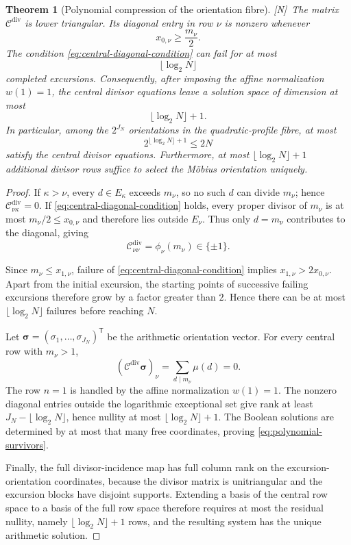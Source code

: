 \documentclass[11pt]{amsart}
\numberwithin{equation}{section}
\theoremstyle{plain}
\newtheorem{theorem}{Theorem}[section]
\theoremstyle{definition}
\theoremstyle{remark}
\newcommand{\tagN}{\textup{[N]}}
\begin{document}
\begin{theorem}[Polynomial compression of the orientation fibre]
\label{thm:polynomial-orientation-compression}
\tagN\ The matrix $\mathscr C^{\mathrm{div}}$ is lower triangular.  Its diagonal entry in row $\nu$ is nonzero whenever
\begin{equation}
x_{0,\nu}\ge \frac{m_\nu}{2}.
\label{eq:central-diagonal-condition}
\end{equation}
The condition \eqref{eq:central-diagonal-condition} can fail for at most
\[
\lfloor\log_2N\rfloor
\]
completed excursions.  Consequently, after imposing the affine normalization $w(1)=1$, the central divisor equations leave a solution space of dimension at most
\[
\lfloor\log_2N\rfloor+1.
\]
In particular, among the $2^{J_N}$ orientations in the quadratic-profile fibre, at most
\begin{equation}
2^{\lfloor\log_2N\rfloor+1}\le2N
\label{eq:polynomial-survivors}
\end{equation}
satisfy the central divisor equations.  Furthermore, at most $\lfloor\log_2N\rfloor+1$ additional divisor rows suffice to select the M\"obius orientation uniquely.
\end{theorem}

\begin{proof}
If $\kappa>\nu$, every $d\in E_\kappa$ exceeds $m_\nu$, so no such $d$ can divide $m_\nu$; hence $\mathscr C^{\mathrm{div}}_{\nu\kappa}=0$.  If \eqref{eq:central-diagonal-condition} holds, every proper divisor of $m_\nu$ is at most $m_\nu/2\le x_{0,\nu}$ and therefore lies outside $E_\nu$.  Thus only $d=m_\nu$ contributes to the diagonal, giving
\[
\mathscr C^{\mathrm{div}}_{\nu\nu}=\phi_\nu(m_\nu)\in\{\pm1\}.
\]

Since $m_\nu\le x_{1,\nu}$, failure of \eqref{eq:central-diagonal-condition} implies $x_{1,\nu}>2x_{0,\nu}$.  Apart from the initial excursion, the starting points of successive failing excursions therefore grow by a factor greater than $2$.  Hence there can be at most $\lfloor\log_2N\rfloor$ failures before reaching $N$.

Let $\boldsymbol\sigma=(\sigma_1,\dots,\sigma_{J_N})^{\mathsf T}$ be the arithmetic orientation vector.  For every central row with $m_\nu>1$,
\[
(\mathscr C^{\mathrm{div}}\boldsymbol\sigma)_\nu
=
\sum_{d\mid m_\nu}\mu(d)=0.
\]
The row $n=1$ is handled by the affine normalization $w(1)=1$.  The nonzero diagonal entries outside the logarithmic exceptional set give rank at least $J_N-\lfloor\log_2N\rfloor$, hence nullity at most $\lfloor\log_2N\rfloor+1$.  The Boolean solutions are determined by at most that many free coordinates, proving \eqref{eq:polynomial-survivors}.

Finally, the full divisor-incidence map has full column rank on the excursion-orientation coordinates, because the divisor matrix is unitriangular and the excursion blocks have disjoint supports.  Extending a basis of the central row space to a basis of the full row space therefore requires at most the residual nullity, namely $\lfloor\log_2N\rfloor+1$ rows, and the resulting system has the unique arithmetic solution.
\end{proof}
\end{document}
